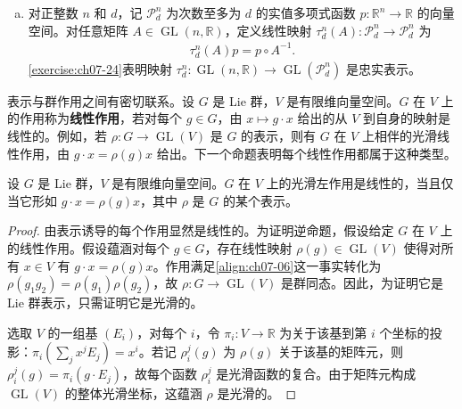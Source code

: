 \documentclass[../../main.tex]{subfiles}
\begin{document}
\begin{example}
\begin{enumerate}[(a)]
\item 对正整数 $n$ 和 $d$，记 $\mathcal{P}_d^n$ 为次数至多为 $d$ 的实值多项式函数 $p\colon\mathbb{R}^n\to\mathbb{R}$ 的向量空间。对任意矩阵 $A\in\operatorname{GL}(n,\mathbb{R})$，定义线性映射 $\tau_d^n(A)\colon\mathcal{P}_d^n\to\mathcal{P}_d^n$ 为
\begin{align*}
\tau_d^n(A)p=p\circ A^{-1}.
\end{align*}
\cref{exercise:ch07-24}表明映射 $\tau_d^n\colon\operatorname{GL}(n,\mathbb{R})\to\operatorname{GL}(\mathcal{P}_d^n)$ 是忠实表示。
\end{enumerate}
\end{example}

表示与群作用之间有密切联系。设 $G$ 是 Lie 群，$V$ 是有限维向量空间。$G$ 在 $V$ 上的作用称为\textbf{线性作用}，若对每个 $g\in G$，由 $x\mapsto g\cdot x$ 给出的从 $V$ 到自身的映射是线性的。例如，若 $\rho\colon G\to\operatorname{GL}(V)$ 是 $G$ 的表示，则有 $G$ 在 $V$ 上相伴的光滑线性作用，由 $g\cdot x=\rho(g)x$ 给出。下一个命题表明每个线性作用都属于这种类型。

\begin{proposition}\label{proposition:ch07-37}
设 $G$ 是 Lie 群，$V$ 是有限维向量空间。$G$ 在 $V$ 上的光滑左作用是线性的，当且仅当它形如 $g\cdot x=\rho(g)x$，其中 $\rho$ 是 $G$ 的某个表示。
\end{proposition}

\begin{proof}
由表示诱导的每个作用显然是线性的。为证明逆命题，假设给定 $G$ 在 $V$ 上的线性作用。假设蕴涵对每个 $g\in G$，存在线性映射 $\rho(g)\in\operatorname{GL}(V)$ 使得对所有 $x\in V$ 有 $g\cdot x=\rho(g)x$。作用满足\eqref{align:ch07-06}这一事实转化为 $\rho(g_1g_2)=\rho(g_1)\rho(g_2)$，故 $\rho\colon G\to\operatorname{GL}(V)$ 是群同态。因此，为证明它是 Lie 群表示，只需证明它是光滑的。

选取 $V$ 的一组基 $(E_i)$，对每个 $i$，令 $\pi_i\colon V\to\mathbb{R}$ 为关于该基到第 $i$ 个坐标的投影：$\pi_i(\sum_j x^j E_j)=x^i$。若记 $\rho_i^j(g)$ 为 $\rho(g)$ 关于该基的矩阵元，则 $\rho_i^j(g)=\pi_i(g\cdot E_j)$，故每个函数 $\rho_i^j$ 是光滑函数的复合。由于矩阵元构成 $\operatorname{GL}(V)$ 的整体光滑坐标，这蕴涵 $\rho$ 是光滑的。
\end{proof}
\end{document}
